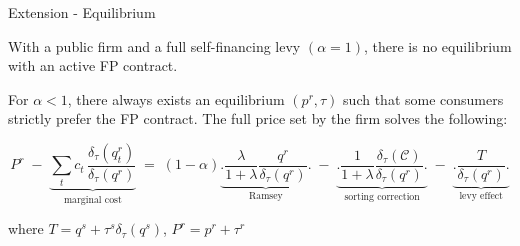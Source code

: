 \documentclass{class}
\begin{document}
\begin{frame}{Extension - Equilibrium \hyperlink{RamseyOutside}{}}\label{Ramseytax}
    
\begin{lemma}\label{lem:tax}
With a public firm and a full self-financing levy $\left(\alpha=1\right)$, there is no equilibrium with an active FP contract.
\end{lemma}

\begin{proposition}\label{prop:tax}
For $\alpha < 1$, there always exists an equilibrium $(p^r,\tau)$ such that some consumers strictly prefer the FP contract. The full price set by the firm solves the following:
 
\begin{equation*}
 P^r \;-\;
\underbrace{\sum_{t} c_t\,\frac{\delta_{\tau}(q_t^r)}{\delta_{\tau}(q^r)}}_{\text{marginal cost}} \;  = \; (1-\alpha)\underbrace{\Bigg. \frac{\lambda}{1+\lambda} \frac{q^r}{\delta_{\tau}(q^r)}\Bigg.}_{\text{Ramsey}}  \; - \;   \underbrace{\Bigg. \frac{1}{1+\lambda} \frac{\delta_\tau(\mathcal{C})}{\delta_\tau(q^r)} \Bigg.}_{\text{sorting correction}} \; - \;   \underbrace{ \Bigg. \frac{T}{\delta_{\tau}(q^r)}  \Bigg.}_{\text{levy effect}}  
\end{equation*}

where $T = q^s + \tau^s \delta_{\tau}(q^s)$, $P^r = p^r + \tau^r$

\end{proposition}

\end{frame}

 
\end{document}
